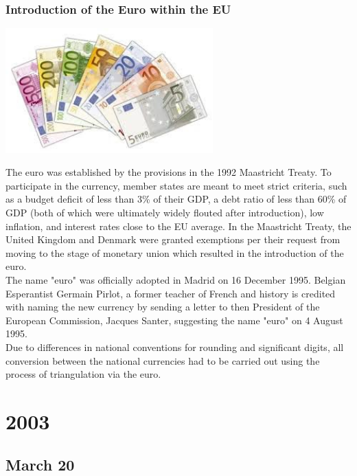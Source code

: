 \documentclass[11pt]{report}
\begin{document}
\subsection{Introduction of the Euro within the EU}
\vspace{2mm}\begin{center}\includegraphics[width=8cm]{./img/euro.jpg}\end{center}
The euro was established by the provisions in the 1992 Maastricht Treaty. To participate in the currency, member states are meant to meet strict criteria, such as a budget deficit of less than 3\% of their GDP, a debt ratio of less than 60\% of GDP (both of which were ultimately widely flouted after introduction), low inflation, and interest rates close to the EU average. In the Maastricht Treaty, the United Kingdom and Denmark were granted exemptions per their request from moving to the stage of monetary union which resulted in the introduction of the euro.\\
\indent The name "euro" was officially adopted in Madrid on 16 December 1995. Belgian Esperantist Germain Pirlot, a former teacher of French and history is credited with naming the new currency by sending a letter to then President of the European Commission, Jacques Santer, suggesting the name "euro" on 4 August 1995.\\
\indent Due to differences in national conventions for rounding and significant digits, all conversion between the national currencies had to be carried out using the process of triangulation via the euro. 

\chapter{2003}
\section{March 20}
\end{document}
